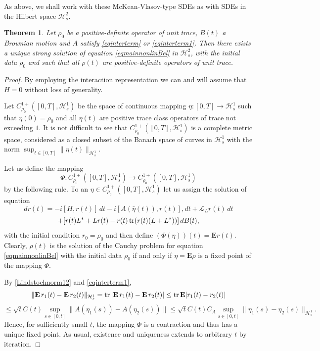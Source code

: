 \documentclass[12pt]{article}
\def\LC{\mathcal{L}}
\def\HC{\mathcal{H}}
\def\E{\mathbf{E}}
\def\tr{\rm{tr}}
\newtheorem{theorem}{Theorem}[section]
\begin{document}
 As above, we shall work with these McKean-Vlasov-type SDEs
 as with SDEs in the Hilbert space $\HC^2_s$.

 \begin{theorem}
\label{mainMFmaster2}
Let $\rho_0$ be a positive-definite operator of unit trace,
 $B(t)$ a Brownian motion and $A$ satisfy \eqref{eqinterterm} or \eqref{eqinterterm1}.
Then there exists a unique strong solution of equation \eqref{eqmainnonlinBel}
in $\HC^2_s$, with the initial data $\rho_0$
and such that all $\rho(t)$ are positive-definite operators of unit trace.
\end{theorem}

\begin{proof}
By employing the interaction representation
we can and will assume that $H=0$ without loss of generality.

Let $C_{\rho_0}^{1+}([0,T], \HC^1_s)$ be the space of continuous mapping
$\eta: [0,T] \to \HC^1_s$ such that $\eta(0)=\rho_0$ and all $\eta(t)$ are positive
trace class operators of trace not exceeding $1$. It is not difficult to see that
$C_{\rho_0}^{1+}([0,T], \HC^1_s)$ is a complete metric space,
considered as a closed subset of the Banach space of curves in $\HC^1_s$ with the norm
$\sup_{t\in [0,T]} \|\eta(t)\|_{\HC^1_s}$.

Let us define the mapping
\[
\Phi: C_{\rho_0}^{1+}([0,T], \HC^1_s)
\to C_{\rho_0}^{1+}([0,T], \HC^1_s)
\]
by the following rule. To an $\eta \in C_{\rho_0}^{1+}([0,T], \HC^1_s)$
let us assign the solution  of equation
 \[
d r(t)=-i[H,r(t)] \, dt-i[A(\bar \eta(t)), r(t)] , dt
+\LC_L r(t) \, dt
\]
\begin{equation}
\label{eqmainnonlinBela}
+[r(t) L^*+L r(t)-r(t) \, {\tr} (r(t)(L+L^*))] \, dB(t),
\end{equation}
with the initial condition $r_0=\rho_0$ and then define $(\Phi (\eta))(t)= \E r(t)$.
Clearly, $\rho(t)$ is the solution of the Cauchy problem for equation
\eqref{eqmainnonlinBel} with the initial data $\rho_0$ if and only if
$\eta=\E \rho$ is a fixed point of the mapping $\Phi$.

By \eqref{Lindstochnorm12} and \eqref{eqinterterm1},
\[
\| \E \, r_1(t)-\E \, r_2(t)\|_{\HC^1_s}
= {\tr}\, |\E \, r_1(t)-\E \, r_2(t)|\le {\tr}\, \E |r_1(t)-r_2(t)|
\]
\[
\le
\sqrt t C(t)\sup_{s\in [0,t]} \|A(\eta_1(s))-A(\eta_2(s))\|
\le \sqrt t C(t) C_A \sup_{s\in [0,t]}\|\eta_1(s)-\eta_2(s)\|_{\HC^1_s}.
\]
Hence, for sufficiently small $t$, the mapping $\Phi$ is a contraction and thus
has a unique fixed point. As usual, existence and uniqueness extends to arbitrary $t$
by iteration.
\end{proof}
\end{document}
